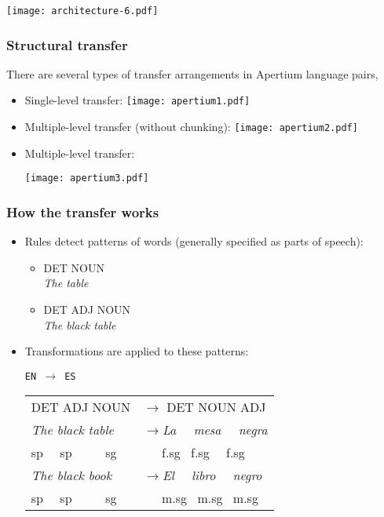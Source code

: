 \documentclass[10pt,xetex]{beamer} %
\begin{document}
\begin{frame}
\begin{center}
\texttt{[image: architecture-6.pdf]}
\end{center}
\end{frame}


\begin{frame}
  \frametitle{Structural transfer}

There are several types of transfer arrangements in Apertium language pairs,

\begin{itemize}
  \item Single-level transfer:
\texttt{[image: apertium1.pdf]}

  \item Multiple-level transfer (without chunking):
\texttt{[image: apertium2.pdf]}

  \item Multiple-level transfer:

\texttt{[image: apertium3.pdf]}
  
\end{itemize}

\end{frame}

\begin{frame}
\frametitle{How the transfer works}

\begin{itemize}
\item Rules detect patterns of words (generally specified as parts of speech):

  \begin{itemize}
  \item DET NOUN\\
    \emph{The table}
  \item DET ADJ NOUN\\ 
    \emph{The black table}
   \end{itemize}
\item Transformations are applied to these patterns:


\texttt{EN $\rightarrow$ ES}
\newline
\newline
 \begin{tabular}{ll}
   DET ADJ NOUN & $\rightarrow$ DET NOUN ADJ\\
   \emph{The black table} &  $\rightarrow$\emph{La ~~mesa ~~negra}\\
          sp  ~~sp ~~~~  sg     & ~~~f.sg ~f.sg ~~f.sg\\
\hline
   \emph{The black book} &  $\rightarrow$\emph{El ~~libro ~~negro}\\
          sp  ~~sp ~~~~  sg     & ~~~m.sg ~m.sg ~m.sg\\
  \end{tabular}

   \end{itemize}
\end{frame}
\end{document}
